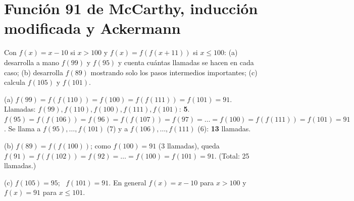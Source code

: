 \section{Función 91 de McCarthy, inducción modificada y Ackermann}

\begin{prob}
Con $f(x)=x-10$ si $x>100$ y $f(x)=f(f(x+11))$ si $x\le100$:
(a) desarrolla a mano $f(99)$ y $f(95)$ y cuenta cuántas llamadas se hacen en cada caso;
(b) desarrolla $f(89)$ mostrando solo los pasos intermedios importantes;
(c) calcula $f(105)$ y $f(101)$.
\end{prob}
\begin{sol}
(a) $f(99)=f(f(110))=f(100)=f(f(111))=f(101)=91$. Llamadas: $f(99),f(110),f(100),f(111),f(101)$: \textbf{5}.\\
$f(95)=f(f(106))=f(96)=f(f(107))=f(97)=\dots=f(100)=f(f(111))=f(101)=91$. Se llama a $f(95),\dots,f(101)$ (7) y a $f(106),\dots,f(111)$ (6): \textbf{13} llamadas.

(b) $f(89)=f(f(100))$; como $f(100)=91$ (3 llamadas), queda $f(91)=f(f(102))=f(92)=\dots=f(100)=f(101)=91$. (Total: 25 llamadas.)

(c) $f(105)=95$; \ $f(101)=91$. En general $f(x)=x-10$ para $x>100$ y $f(x)=91$ para $x\le101$.
\end{sol}

